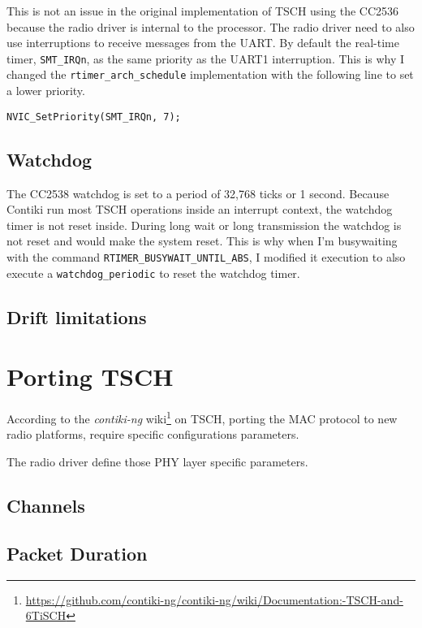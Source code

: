 This is not an issue in the original implementation of TSCH using the CC2536
because the radio driver is internal to the processor.
The radio driver need to also use interruptions to receive messages from the UART.
By default the real-time timer, \lstinline{SMT_IRQn}, as the same priority as
the UART1 interruption. 
This is why I changed the \lstinline{rtimer_arch_schedule} implementation with
the following line to set a lower priority.

\begin{lstlisting}
NVIC_SetPriority(SMT_IRQn, 7); 
\end{lstlisting}

\subsection{Watchdog}

The CC2538 watchdog is set to a period of 32,768 ticks or 1 second. 
Because Contiki run most TSCH operations inside an interrupt
context, the watchdog timer is not reset inside.
During long wait or long transmission the watchdog is not reset and would
make the system reset.
This is why when I'm busywaiting with the command
\lstinline{RTIMER_BUSYWAIT_UNTIL_ABS}, I modified it execution to also execute
a \lstinline{watchdog_periodic} to reset the watchdog timer.

\subsection{Drift limitations}

\section{Porting TSCH}

According to the \emph{contiki-ng}
wiki\footnote{\url{https://github.com/contiki-ng/contiki-ng/wiki/Documentation:-TSCH-and-6TiSCH}}
on TSCH, porting the MAC protocol to new radio platforms, require specific
configurations parameters.

The radio driver define those PHY layer specific parameters.

\subsection{Channels}


\subsection{Packet Duration}

